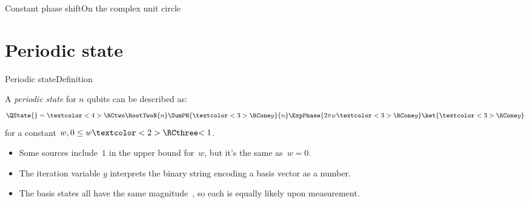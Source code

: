 \begin{frame}{Constant phase shift}{On the complex unit circle}
{{\begin{itemize}
\end{itemize}}
}
\end{frame}

\section*{Periodic state}
\begin{frame}{Periodic state}{Definition}

A \emph{periodic state} \QState{} for $n$ qubits can be described as:
\[
\QState{} = \textcolor<4>{\RCtwo}{\RootTwoN{n}}\SumPH{\textcolor<3>{\RCone}{y}}{n} \ExpPhase{2\pi w\textcolor<3>{\RCone}{y}} \ket{\textcolor<3>{\RCone}{y}}
\]
for a constant $w, 0 \leq w \textcolor<2>{\RCthree}{< 1}$.
\begin{itemize}
    \item<2-> Some sources include~$1$ in \textcolor<2>{\RCthree}{the upper bound for~$w$}, but it's the same as~$w=0$.
    \item<3-> The iteration variable \textcolor<3>{\RCone}{$y$} interprets the binary string encoding a basis vector as a number.
    \item<4-> The basis states all have the same magnitude~\textcolor<4>{\RCtwo}{}, so each is equally likely upon measurement.
\end{itemize}
    
\end{frame}

